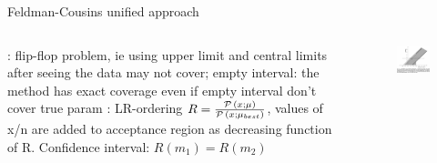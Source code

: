 \documentclass[asd-beamer.tex]{subfiles}
\begin{document}
\begin{frame}{Feldman-Cousins unified approach}\frameintoc
\begin{columns}[T]
\begin{column}{0.5\textwidth}
: flip-flop problem, ie using upper limit and central limits after seeing the data may not cover; empty interval: the method has exact coverage even if empty interval don't cover true param
: LR-ordering $R=\frac{\operatorname{\mathcal{P}}{(x;\mu)}}{\operatorname{\mathcal{P}}{(x;\mu_{best})}}$, values of x/n are added to acceptance region as decreasing function of R.
Confidence interval: $R(m_1)=R(m_2)$
\end{column}
\begin{column}{0.5\textwidth}
\begin{figure}[!ht]\includegraphics[trim={0cm 0cm 0 0},clip, keepaspectratio,height=0.49\textheight]{figures/james/estimators/flipflopping}\label{fig:flipflopping}\end{figure}
\end{column}
\end{columns}

\end{frame}
\end{document}
